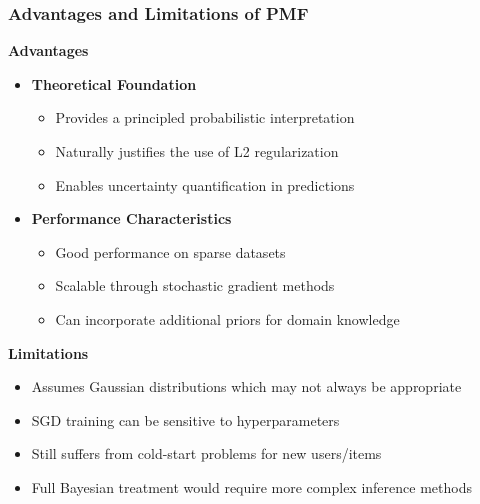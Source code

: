\documentclass{beamer}
\begin{document}
\begin{frame}
\frametitle{Advantages and Limitations of PMF}

\textbf{Advantages}
\begin{itemize}
    \item \textbf{Theoretical Foundation}
    \begin{itemize}
        \item Provides a principled probabilistic interpretation
        \item Naturally justifies the use of L2 regularization
        \item Enables uncertainty quantification in predictions
    \end{itemize}
    
    \item \textbf{Performance Characteristics}
    \begin{itemize}
        \item Good performance on sparse datasets
        \item Scalable through stochastic gradient methods
        \item Can incorporate additional priors for domain knowledge
    \end{itemize}
\end{itemize}

\textbf{Limitations}
\begin{itemize}
    \item Assumes Gaussian distributions which may not always be appropriate
    \item SGD training can be sensitive to hyperparameters
    \item Still suffers from cold-start problems for new users/items
    \item Full Bayesian treatment would require more complex inference methods
\end{itemize}
\end{frame}
\end{document}
